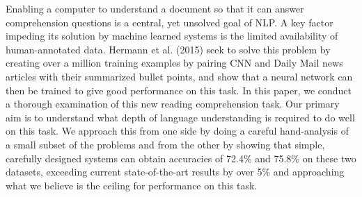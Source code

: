 Enabling a computer to understand a document so that it can answer comprehension questions is a central, yet unsolved goal of NLP. A key factor impeding its solution by machine learned systems is the limited availability of human-annotated data. Hermann et al. (2015) seek to solve this problem by creating over a million training examples by pairing CNN and Daily Mail news articles with their summarized bullet points, and show that a neural network can then be trained to give good performance on this task. In this paper, we conduct a thorough examination of this new reading comprehension task. Our primary aim is to understand what depth of language understanding is required to do well on this task. We approach this from one side by doing a careful hand-analysis of a small subset of the problems and from the other by showing that simple, carefully designed systems can obtain accuracies of 72.4\% and 75.8\% on these two datasets, exceeding current state-of-the-art results by over 5\% and approaching what we believe is the ceiling for performance on this task.
